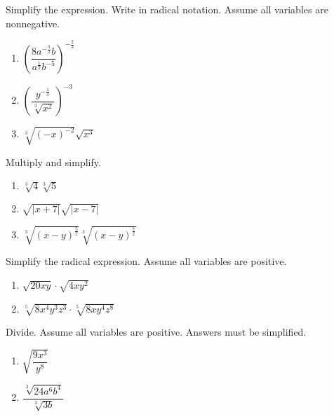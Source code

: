 \begin{exercise}
  Simplify the expression. Write in radical notation. Assume all variables
  are nonnegative.
  
  \begin{enumerate}
  \item
    \(\left(\dfrac{8a^{-\frac{5}{2}}b}{a^{\frac12}b^{-5}}\right)^{-\frac23}\)
  \item
    \(\left(\dfrac{y^{-\frac{1}{3}}}{\sqrt[3]{x^{2}}}\right)^{-3}\)
  \item
    \(\sqrt[3]{(-x)^{-2}}\sqrt{x^3}\)
  \end{enumerate}
\end{exercise}

\begin{exercise}
  Multiply and simplify.
  
  \begin{enumerate}
  \item
    \(\sqrt[3]{4}\sqrt[3]{5}\)
  \item
    \(\sqrt{|x+7|}\sqrt{|x-7|}\)
  \item
    \(\sqrt[3]{(x-y)^{\frac52}}\sqrt[3]{(x-y)^{\frac72}}\)
  \end{enumerate}
\end{exercise}

\begin{exercise}
  Simplify the radical expression. Assume all variables are positive.
  
  \begin{enumerate}
  \item
    \(\sqrt{20xy}\cdot\sqrt{4xy^2}\)
  \item
    \(\sqrt[5]{8x^4y^3z^3}\cdot\sqrt[5]{8xy^4z^8}\)
  \end{enumerate}
\end{exercise}

\begin{exercise}
  Divide. Assume all variables are positive. Answers must be simplified.
  
  \begin{enumerate}
  \item
    \(\sqrt{\dfrac{9x^3}{y^8}}\)
  \item
    \(\dfrac{\sqrt[3]{24a^6b^4}}{\sqrt[3]{3b}}\)
  \end{enumerate}
\end{exercise}


